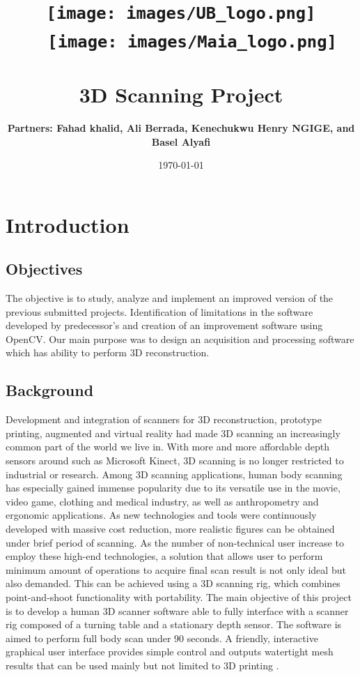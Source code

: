 \documentclass[a4paper]{report}
\begin{document}

\title{
\texttt{[image: images/UB\_logo.png]}
\	\	\texttt{[image: images/Maia\_logo.png]}
\textbf{\\ \  \\ 3D Scanning Project}}
\author{\textbf{Partners: Fahad khalid, Ali Berrada, Kenechukwu Henry NGIGE, and Basel Alyafi}}
\date{\today}
\maketitle


\tableofcontents
\listoffigures
\chapter{Introduction}
\section{Objectives}
The objective is to study, analyze and implement an improved version of the previous submitted projects. Identification of limitations in the software developed by predecessor's and creation of an improvement software using OpenCV. Our main purpose was to design an acquisition and processing software which has ability to perform 3D reconstruction.
\section{Background}
Development and integration of scanners for 3D reconstruction, prototype printing, augmented and virtual reality had made 3D scanning an increasingly common part of the world we live in. With more and more affordable depth sensors around such as Microsoft Kinect, 3D scanning is no longer restricted to industrial or research. Among 3D scanning applications, human body scanning has especially gained immense popularity due to its versatile use in the movie, video game, clothing and medical industry, as well as anthropometry and ergonomic applications. As new technologies and tools were continuously developed with massive cost reduction, more realistic figures can be obtained under brief period of scanning. As the number of non-technical user increase to employ these high-end technologies, a solution that allows user to perform minimum amount of operations to acquire final scan result is not only ideal but also demanded. This can be achieved using a 3D scanning rig, which combines point-and-shoot functionality with portability. The main objective of this project is to develop a human 3D scanner software able to fully interface with a scanner rig composed of a turning table and a stationary depth sensor. The software is aimed to perform full body scan under 90 seconds. A friendly, interactive graphical user interface provides simple control and outputs watertight mesh results that can be used mainly but not limited to 3D printing \cite{ref5}.
\end{document}
